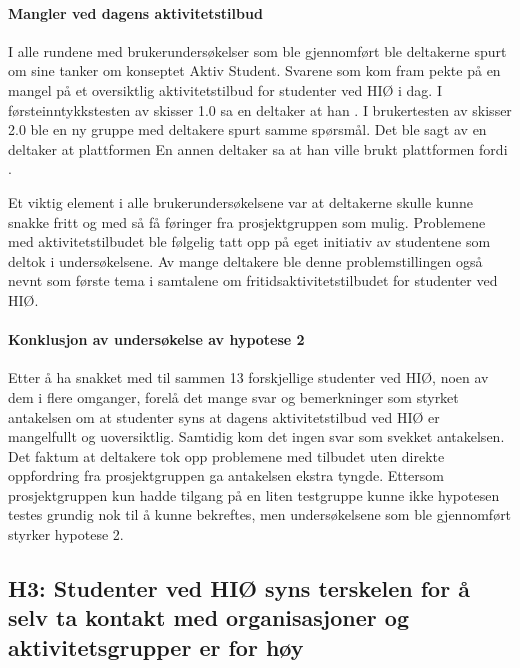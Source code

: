 \paragraph{Mangler ved dagens aktivitetstilbud}
I alle rundene med brukerundersøkelser som ble gjennomført ble deltakerne spurt om sine tanker om konseptet Aktiv Student. Svarene som kom fram pekte på en mangel på et oversiktlig aktivitetstilbud for studenter ved HIØ i dag. I førsteinntykkstesten av skisser 1.0 sa en deltaker at han . I brukertesten av skisser 2.0 ble en ny gruppe med deltakere spurt samme spørsmål. Det ble sagt av en deltaker at plattformen  En annen deltaker sa at han ville brukt plattformen fordi .

Et viktig element i alle brukerundersøkelsene var at deltakerne skulle kunne snakke fritt og med så få føringer fra prosjektgruppen som mulig. Problemene med aktivitetstilbudet ble følgelig tatt opp på eget initiativ av studentene som deltok i undersøkelsene. Av mange deltakere ble denne problemstillingen også nevnt som første tema i samtalene om fritidsaktivitetstilbudet for studenter ved HIØ.

\paragraph{Konklusjon av undersøkelse av hypotese 2}
Etter å ha snakket med til sammen 13 forskjellige studenter ved HIØ, noen av dem i flere omganger, forelå det mange svar og bemerkninger som styrket antakelsen om at studenter syns at dagens aktivitetstilbud ved HIØ er mangelfullt og uoversiktlig. Samtidig kom det ingen svar som svekket antakelsen. Det faktum at deltakere tok opp problemene med tilbudet uten direkte oppfordring fra prosjektgruppen ga antakelsen ekstra tyngde. Ettersom prosjektgruppen kun hadde tilgang på en liten testgruppe kunne ikke hypotesen testes grundig nok til å kunne bekreftes, men undersøkelsene som ble gjennomført styrker hypotese 2.

\subsection{H3: Studenter ved HIØ syns terskelen for å selv ta kontakt med organisasjoner og aktivitetsgrupper er for høy}


